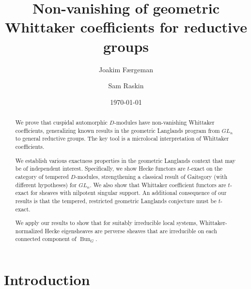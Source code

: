 \documentclass[reqno,11pt]{amsart}
\date{\today}
\numberwithin{equation}{subsection}
\theoremstyle{remark}
\newcommand{\on}{\operatorname}
\newcommand{\Bun}{\on{Bun}}
\begin{document}
\frenchspacing

\setlength{\epigraphwidth}{0.4\textwidth}
\renewcommand{\epigraphsize}{\footnotesize}


\title{Non-vanishing of geometric Whittaker coefficients for reductive groups}

\author{Joakim F\ae rgeman}

\address{The University of Texas at Austin, 
Department of Mathematics, 
PMA 8.100, 2515 Speedway Stop C1200, 
Austin, TX 78712}


\author{Sam Raskin}

\address{The University of Texas at Austin, 
Department of Mathematics, 
PMA 8.100, 2515 Speedway Stop C1200, 
Austin, TX 78712}


\maketitle

\begin{abstract}

We prove that cuspidal automorphic $D$-modules have non-vanishing Whittaker
coefficients, generalizing known results
in the geometric Langlands program from $GL_n$ to general reductive groups.
The key tool is a microlocal interpretation of Whittaker coefficients.

We establish various exactness properties in the geometric Langlands
context that may be of independent interest. Specifically, we show
Hecke functors are $t$-exact on the category of tempered $D$-modules,
strengthening a classical result of Gaitsgory (with different hypotheses) 
for $GL_n$. We also show that Whittaker coefficient functors are $t$-exact
for sheaves with nilpotent singular support. An additional consequence
of our results is that the 
tempered, restricted geometric Langlands conjecture must
be $t$-exact. 

We apply our results to show that for suitably irreducible local systems, 
Whittaker-normalized Hecke eigensheaves
are perverse sheaves that are irreducible on each connected component
of $\Bun_G$.

 \end{abstract}

\setcounter{tocdepth}{2}
\tableofcontents

\section{Introduction}\label{s:intro}
\end{document}
